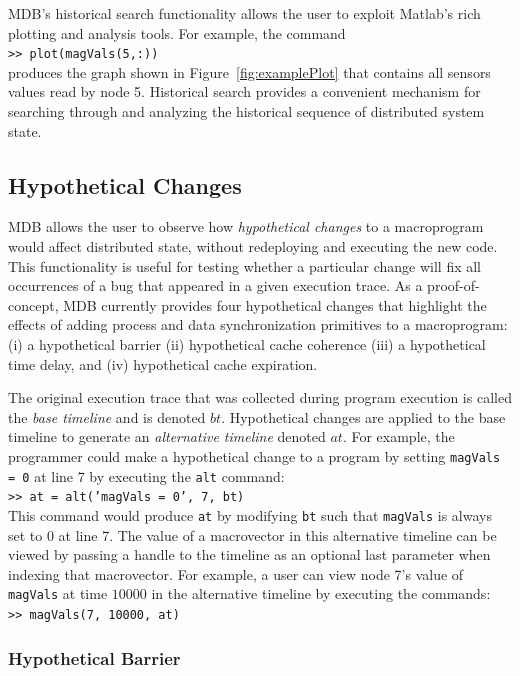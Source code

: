 MDB's historical search functionality allows the user to exploit Matlab's rich
plotting and analysis tools.  For example, the command\\ {\small\indent\tt >>
plot(magVals(5,:))}\\ produces the graph shown in Figure~\ref{fig:examplePlot}
that contains all sensors values read by node 5.  Historical search provides a
convenient mechanism for searching through and analyzing the historical sequence
of distributed system state.

\subsection{Hypothetical Changes} \label{views}

MDB allows the user to observe how {\em hypothetical changes} to a macroprogram
would affect distributed state, without redeploying and executing the new
code. This functionality is useful for testing whether a particular change will
fix all occurrences of a bug that appeared in a given execution trace. As a
proof-of-concept, MDB currently provides four hypothetical changes that highlight the
effects of adding process and data synchronization primitives to a macroprogram:
(i) a hypothetical barrier (ii) hypothetical cache coherence (iii) a
hypothetical time delay, and (iv) hypothetical cache expiration.

The original execution trace that was collected during program
execution is called the {\em base timeline} and is denoted $bt$.
Hypothetical changes are applied to the base timeline to generate
an {\em alternative timeline} denoted $at$.  For example, the programmer
could make a hypothetical change to a program by setting {\tt magVals
  = 0} at line
7 by executing the {\tt alt} command:\\ {\small\indent\tt >> at =
  alt('magVals = 0', 7, bt)}\\ This command would produce {\tt at} by
modifying {\tt bt} such that {\tt magVals} is always set to $0$ at line 7.
The value of a macrovector in this alternative timeline can be viewed by
passing a handle to the timeline as an optional last parameter when
indexing that macrovector.  For
example, a user can view node 7's value of {\tt
  magVals}
at time $10000$ in the alternative timeline by executing the commands:\\
{\tt\small\indent >> magVals(7, 10000, at)}

\subsubsection{Hypothetical Barrier} \label{barrier}

